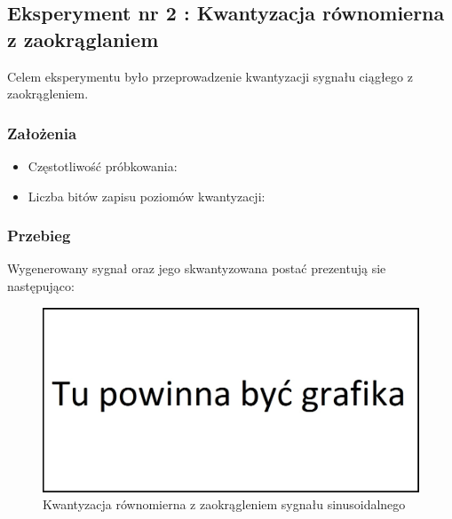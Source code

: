 \documentclass[12pt]{article}
\begin{document}


\newpage
\subsection{Eksperyment nr 2 : Kwantyzacja równomierna z zaokrąglaniem}

Celem eksperymentu było przeprowadzenie kwantyzacji sygnału ciągłego z zaokrągleniem.

\subsubsection{Założenia}

\begin{itemize}
	\item Częstotliwość próbkowania:
	\item Liczba bitów zapisu poziomów kwantyzacji:
\end{itemize}
\subsubsection{Przebieg}
Wygenerowany sygnał oraz jego skwantyzowana postać prezentują sie następująco:
\begin{figure}[H]
	\centering
	\includegraphics[width=\linewidth]{tmp.jpg}
	\caption{Kwantyzacja równomierna z zaokrągleniem sygnału sinusoidalnego}
	\label{wykres dla eksperymentu 2}
\end{figure}
\end{document}
